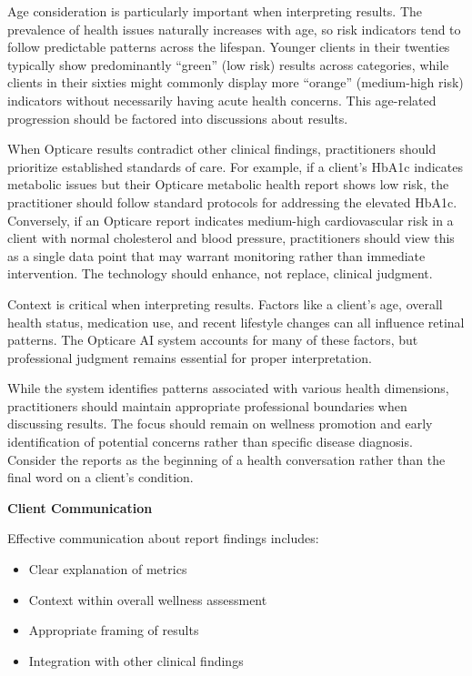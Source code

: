 \documentclass[
  Letterpaper,
]{scrbook}
\providecommand{\tightlist}{%
  \setlength{\itemsep}{0pt}\setlength{\parskip}{0pt}}\usepackage{longtable,booktabs,array}
\begin{document}
Age consideration is particularly important when interpreting results.
The prevalence of health issues naturally increases with age, so risk
indicators tend to follow predictable patterns across the lifespan.
Younger clients in their twenties typically show predominantly ``green''
(low risk) results across categories, while clients in their sixties
might commonly display more ``orange'' (medium-high risk) indicators
without necessarily having acute health concerns. This age-related
progression should be factored into discussions about results.

When Opticare results contradict other clinical findings, practitioners
should prioritize established standards of care. For example, if a
client's HbA1c indicates metabolic issues but their Opticare metabolic
health report shows low risk, the practitioner should follow standard
protocols for addressing the elevated HbA1c. Conversely, if an Opticare
report indicates medium-high cardiovascular risk in a client with normal
cholesterol and blood pressure, practitioners should view this as a
single data point that may warrant monitoring rather than immediate
intervention. The technology should enhance, not replace, clinical
judgment.

Context is critical when interpreting results. Factors like a client's
age, overall health status, medication use, and recent lifestyle changes
can all influence retinal patterns. The Opticare AI system accounts for
many of these factors, but professional judgment remains essential for
proper interpretation.

While the system identifies patterns associated with various health
dimensions, practitioners should maintain appropriate professional
boundaries when discussing results. The focus should remain on wellness
promotion and early identification of potential concerns rather than
specific disease diagnosis. Consider the reports as the beginning of a
health conversation rather than the final word on a client's condition.

\textbf{Client Communication}

Effective communication about report findings includes:

\begin{itemize}
\tightlist
\item
  Clear explanation of metrics
\item
  Context within overall wellness assessment
\item
  Appropriate framing of results
\item
  Integration with other clinical findings
\end{itemize}
\end{document}
